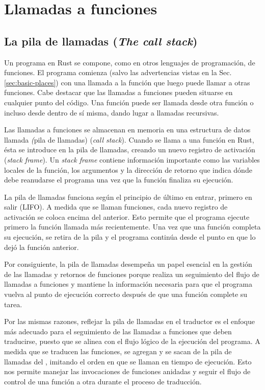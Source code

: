 \section{Llamadas a funciones}
\label{sec:function-calls}

\subsection{La pila de llamadas (\emph{The call stack})}

Un programa en Rust se compone, como en otros lenguajes de programación, de funciones. El
programa comienza (salvo las advertencias vistas en la Sec. \ref{sec:basic-places}) con una llamada a la función
 que luego puede llamar a otras funciones. Cabe destacar que las llamadas a funciones
pueden situarse en cualquier punto del código. Una función puede ser llamada desde otra
función o incluso desde dentro de sí misma, dando lugar a llamadas recursivas.

Las llamadas a funciones se almacenan en memoria en una estructura de datos llamada \emph(pila de
llamadas) (\emph{call stack}). Cuando se llama a una función en Rust, ésta se introduce en la pila de llamadas,
creando un nuevo registro de activación (\textit{stack frame}). Un \textit{stack frame} contiene información importante como las
variables locales de la función, los argumentos y la dirección de retorno que indica dónde debe
reanudarse el programa una vez que la función finaliza su ejecución.

La pila de llamadas funciona según el principio de último en entrar, primero en salir (\acrfull{LIFO}).
A medida que se llaman funciones, cada nuevo registro de activación se coloca encima del anterior.
Esto permite que el programa ejecute primero la función llamada más recientemente. Una vez
que una función completa su ejecución, se retira de la pila y el programa continúa desde el
punto en que lo dejó la función anterior.

Por consiguiente, la pila de llamadas desempeña un papel esencial en la gestión de las llamadas y
retornos de funciones porque realiza un seguimiento del flujo de llamadas a funciones y
mantiene la información necesaria para que el programa vuelva al punto de ejecución correcto
después de que una función complete su tarea.

Por las mismas razones, reflejar la pila de llamadas en el traductor es el enfoque más
adecuado para el seguimiento de las llamadas a funciones que deben traducirse, puesto que se
alinea con el flujo lógico de la ejecución del programa. A medida que se traducen las
funciones, se agregan y se sacan de la pila de llamadas del , imitando el orden en que
se llaman en tiempo de ejecución. Esto nos permite manejar las invocaciones de funciones
anidadas y seguir el flujo de control de una función a otra durante el proceso de traducción.

